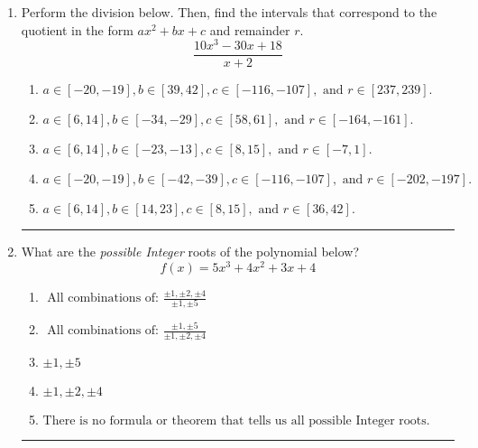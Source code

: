 \documentclass[14pt]{extbook}
\newcommand{\litem}[1]{\item#1\hspace*{-1cm}\rule{\textwidth}{0.4pt}}
\begin{document}
\begin{enumerate}
{\begin{enumerate}[label=\Alph*.]
\end{enumerate} }
\litem{
Perform the division below. Then, find the intervals that correspond to the quotient in the form $ax^2+bx+c$ and remainder $r$.\[ \frac{10x^{3} -30 x + 18}{x + 2} \]\begin{enumerate}[label=\Alph*.]
\item \( a \in [-20, -19], b \in [39, 42], c \in [-116, -107], \text{ and } r \in [237, 239]. \)
\item \( a \in [6, 14], b \in [-34, -29], c \in [58, 61], \text{ and } r \in [-164, -161]. \)
\item \( a \in [6, 14], b \in [-23, -13], c \in [8, 15], \text{ and } r \in [-7, 1]. \)
\item \( a \in [-20, -19], b \in [-42, -39], c \in [-116, -107], \text{ and } r \in [-202, -197]. \)
\item \( a \in [6, 14], b \in [14, 23], c \in [8, 15], \text{ and } r \in [36, 42]. \)

\end{enumerate} }
\litem{
What are the \textit{possible Integer} roots of the polynomial below?\[ f(x) = 5x^{3} +4 x^{2} +3 x + 4 \]\begin{enumerate}[label=\Alph*.]
\item \( \text{ All combinations of: }\frac{\pm 1,\pm 2,\pm 4}{\pm 1,\pm 5} \)
\item \( \text{ All combinations of: }\frac{\pm 1,\pm 5}{\pm 1,\pm 2,\pm 4} \)
\item \( \pm 1,\pm 5 \)
\item \( \pm 1,\pm 2,\pm 4 \)
\item \( \text{There is no formula or theorem that tells us all possible Integer roots.} \)

\end{enumerate} }
\end{enumerate}
\end{document}
